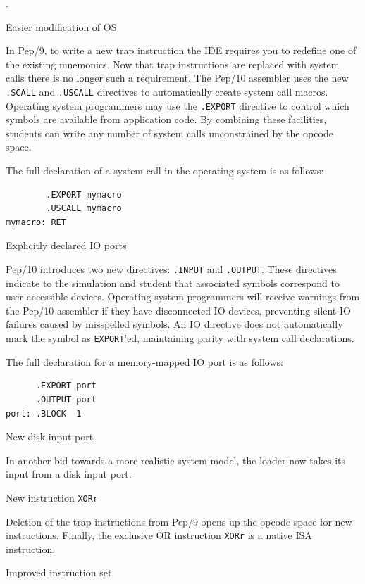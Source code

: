 \documentclass[10pt,fleqn]{book}
\newenvironment{exercises}
   {\begin{list}
      {\arabic{ecounter}.}
      {
         \usecounter{ecounter}
         \setcounter {ecounter}{0}
         \setlength\leftmargin{2pc}
         \setlength\labelwidth{6pc}
         \setlength\labelsep{1pc}
      }}
   {\end{list}}
\newcounter{ecounter}
\begin{document}
\begin{exercises}
\item Easier modification of OS

In Pep/9, to write a new trap instruction the IDE requires you to redefine one of the existing mnemonics.
Now that trap instructions are replaced with system calls there is no longer such a requirement.
The Pep/10 assembler uses the new \verb|.SCALL| and \verb|.USCALL| directives to automatically create system call macros.
Operating system programmers may use the \verb|.EXPORT| directive to control which symbols are available from application code.
By combining these facilities, students can write any number of system calls unconstrained by the opcode space.

The full declaration of a system call in the operating system is as follows:
\begin{verbatim}
        .EXPORT mymacro
        .USCALL mymacro
mymacro: RET
\end{verbatim}

\item Explicitly declared IO ports

Pep/10 introduces two new directives: \verb|.INPUT| and \verb|.OUTPUT|.
These directives indicate to the simulation and student that associated symbols correspond to user-accessible devices.
Operating system programmers will receive warnings from the Pep/10 assembler if they have disconnected IO devices, preventing silent IO failures caused by misspelled symbols.
An IO directive does not automatically mark the symbol as \verb|EXPORT|'ed, maintaining parity with system call declarations.

The full declaration for a memory-mapped IO port is as follows:
\begin{verbatim}
      .EXPORT port
      .OUTPUT port
port: .BLOCK  1
\end{verbatim}

\item New disk input port

In another bid towards a more realistic system model, the loader now takes its input from a disk input port.

\item New instruction \verb|XORr|

Deletion of the trap instructions from Pep/9 opens up the opcode space for new instructions.
Finally, the exclusive OR instruction \verb|XORr| is a native ISA instruction.

\item Improved instruction set


\end{exercises}
\end{document}
